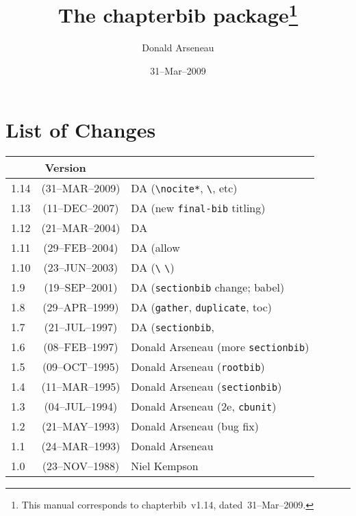 \documentclass[DIV=9, pagesize=auto]{scrartcl}
\title{The \textsf{chapterbib} package\thanks{This manual corresponds to \textsf{chapterbib}~v1.14, dated~31--Mar--2009.}}
\author{Donald Arseneau}
\date{31--Mar--2009}
\makeatletter
\newcommand*{\pkg}[1]{\textsf{#1}}
\newcommand*{\cs}[1]{\texttt{\textbackslash#1}}
\newcommand*{\cmd}[1]{\cs{\expandafter\@gobble\string#1}}
\makeatother
\begin{document}
\maketitle

\tableofcontents

\overfullrule=10pt



\section{List of Changes}

\begin{tabular}{@{}lcl@{}}
  \toprule
  \multicolumn{2}{c}{\textbf{Version}}                                      \\
  \midrule
  1.14 & (31--MAR--2009) & DA (\verb+\nocite*+, \cmd{\CitationPrefix}, etc) \\
  1.13 & (11--DEC--2007) & DA (new \texttt{final-bib} titling)              \\
  1.12 & (21--MAR--2004) & DA                                               \\
  1.11 & (29--FEB--2004) & DA (allow \cmd{\nocite} check)                   \\
  1.10 & (23--JUN--2003) & DA (\cmd{\bibsection} \cmd{\CBMainSectioning})   \\
  1.9  & (19--SEP--2001) & DA (\texttt{sectionbib} change; \pkg{babel})     \\
  1.8  & (29--APR--1999) & DA (\texttt{gather}, \texttt{duplicate}, toc)    \\
  1.7  & (21--JUL--1997) & DA (\texttt{sectionbib}, \cmd{\nocite})          \\
  1.6  & (08--FEB--1997) & Donald Arseneau (more \texttt{sectionbib})       \\
  1.5  & (09--OCT--1995) & Donald Arseneau (\texttt{rootbib})               \\
  1.4  & (11--MAR--1995) & Donald Arseneau (\texttt{sectionbib})            \\
  1.3  & (04--JUL--1994) & Donald Arseneau (2e, \texttt{cbunit})            \\
  1.2  & (21--MAY--1993) & Donald Arseneau (bug fix)                        \\
  1.1  & (24--MAR--1993) & Donald Arseneau                                  \\
  1.0  & (23--NOV--1988) & Niel Kempson                                     \\
  \bottomrule
\end{tabular}
\end{document}
